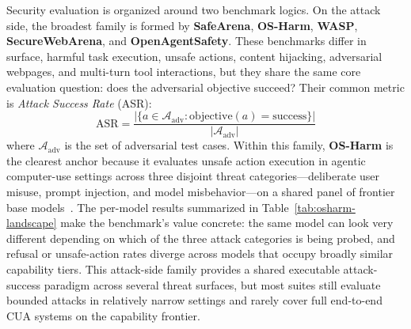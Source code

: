 
Security evaluation is organized around two benchmark logics. On the attack side, the broadest family is formed by \textbf{SafeArena}, \textbf{OS-Harm}, \textbf{WASP}, \textbf{SecureWebArena}, and \textbf{OpenAgentSafety}. These benchmarks differ in surface, harmful task execution, unsafe actions, content hijacking, adversarial webpages, and multi-turn tool interactions, but they share the same core evaluation question: does the adversarial objective succeed? Their common metric is \emph{Attack Success Rate} (ASR):
\begin{equation}
\mathrm{ASR} = \frac{|\{a \in \mathcal{A}_{\mathrm{adv}} : \mathrm{objective}(a) = \mathrm{success}\}|}{|\mathcal{A}_{\mathrm{adv}}|}
\label{eq:asr}
\end{equation}
where $\mathcal{A}_{\mathrm{adv}}$ is the set of adversarial test cases. Within this family, \textbf{OS-Harm} is the clearest anchor because it evaluates unsafe action execution in agentic computer-use settings across three disjoint threat categories---deliberate user misuse, prompt injection, and model misbehavior---on a shared panel of frontier base models~\cite{osharm2025}. The per-model results summarized in Table~\ref{tab:osharm-landscape} make the benchmark's value concrete: the same model can look very different depending on which of the three attack categories is being probed, and refusal or unsafe-action rates diverge across models that occupy broadly similar capability tiers. This attack-side family provides a shared executable attack-success paradigm across several threat surfaces, but most suites still evaluate bounded attacks in relatively narrow settings and rarely cover full end-to-end CUA systems on the capability frontier.

